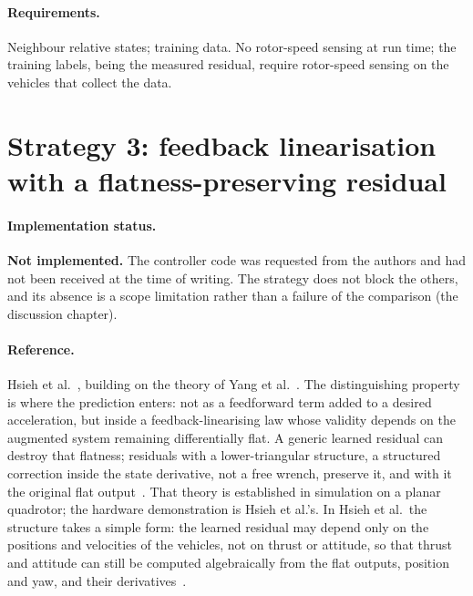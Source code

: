 \paragraph{Requirements.} Neighbour relative states; training data. No rotor-speed sensing at run
time; the training labels, being the measured residual, require rotor-speed sensing on the
vehicles that collect the data.

\section{Strategy 3: feedback linearisation with a flatness-preserving residual}
\label{sec:ctrl-s3}

\paragraph{Implementation status.} \textbf{Not implemented.} The controller code was requested from the
authors and had not been received at the time of writing. The strategy does not block the others,
and its absence is a scope limitation rather than a failure of the comparison
(the discussion chapter).

\paragraph{Reference.} Hsieh et al.~\cite{hsieh2026flatness}, building on the theory of Yang et
al.~\cite{yang2025flatnessresiduals}. The distinguishing property is where the prediction enters:
not as a feedforward term added to a desired acceleration, but inside a feedback-linearising law
whose validity depends on the augmented system remaining differentially flat. A generic learned
residual can destroy that flatness; residuals with a lower-triangular structure, a structured
correction inside the state derivative, not a free wrench, preserve it, and with it the original
flat output~\cite{yang2025flatnessresiduals}. That theory is established in simulation on a planar
quadrotor; the hardware demonstration is Hsieh et al.'s.
In Hsieh et al.\ the structure takes a simple form: the learned residual may depend only on the
positions and velocities of the vehicles, not on thrust or attitude, so that thrust and attitude
can still be computed algebraically from the flat outputs, position and yaw, and their
derivatives~\cite{hsieh2026flatness}.

